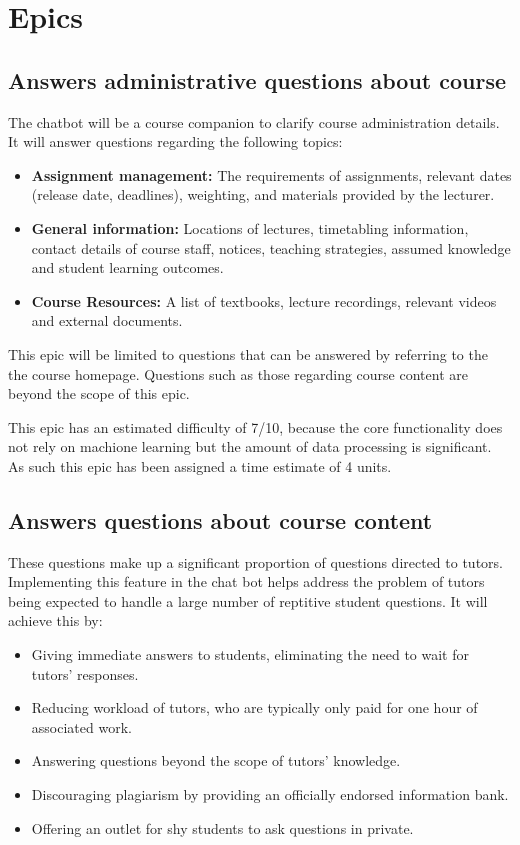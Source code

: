 \documentclass{article}
\begin{document}
\section{Epics}

\subsection{Answers administrative questions about course}

The chatbot will be a course companion to clarify course administration details. It will answer questions regarding the following topics:
\begin{itemize}
  \item \textbf{Assignment management:} The requirements of assignments, relevant dates (release date, deadlines), weighting, and materials provided by the lecturer.
  \item \textbf{General information:} Locations of lectures, timetabling information, contact details of course staff, notices, teaching strategies, assumed knowledge and student learning outcomes.
  \item \textbf{Course Resources:} A list of textbooks, lecture recordings, relevant videos and external documents. 
\end{itemize}

This epic will be limited to questions that can be answered by referring to the the course homepage. Questions such as those regarding course content are beyond the scope of this epic.

This epic has an estimated difficulty of 7/10, because the core functionality does not rely on machione learning but the amount of data processing is significant. As such this epic has been assigned a time estimate of 4 units. 

\subsection{Answers questions about course content}
These questions make up a significant proportion of questions directed to tutors. Implementing this feature in the chat bot helps address the problem of tutors being expected to handle a large number of reptitive student questions. It will achieve this by:
\begin{itemize}
  \item Giving immediate answers to students, eliminating the need to wait for tutors' responses.
  \item Reducing workload of tutors, who are typically only paid for one hour of associated work.
  \item Answering questions beyond the scope of tutors' knowledge.
  \item Discouraging plagiarism by providing an officially endorsed information bank.
  \item Offering an outlet for shy students to ask questions in private.
\end{itemize}
\end{document}
